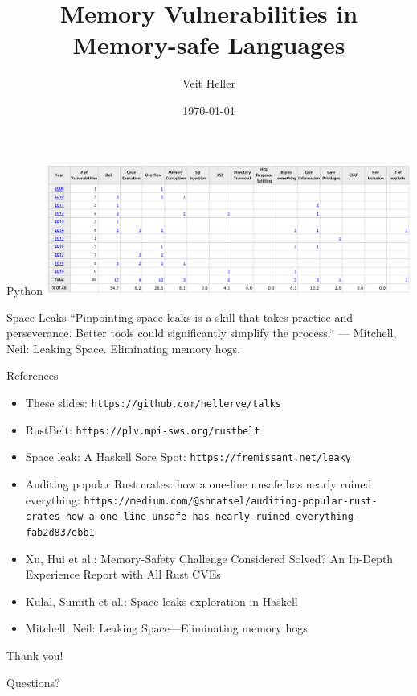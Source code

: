 \documentclass[aspectratio=169,14pt]{beamer}
\title{Memory Vulnerabilities in Memory-safe Languages}
\date{\today}
\author{Veit Heller}
\institute{Information Security Meetup Berlin, August 2020}
\begin{document}
  \maketitle
  \begin{frame}{Python}
    \includegraphics[width=12cm]{python_cves}
  \end{frame}
  \begin{frame}{Space Leaks}
    ``Pinpointing space leaks is a skill that takes practice and perseverance. Better
    tools could significantly simplify the process.``
    --- Mitchell, Neil: Leaking Space. Eliminating memory hogs.
  \end{frame}
  \begin{frame}{References}
    \begin{itemize}
      \item These slides: \texttt{https://github.com/hellerve/talks}
      \item RustBelt: \texttt{https://plv.mpi-sws.org/rustbelt}
      \item Space leak: A Haskell Sore Spot: \texttt{https://fremissant.net/leaky}
      \item Auditing popular Rust crates: how a one-line unsafe has nearly ruined everything: \texttt{https://medium.com/@shnatsel/auditing-popular-rust-crates-how-a-one-line-unsafe-has-nearly-ruined-everything-fab2d837ebb1}
      \item Xu, Hui et al.: Memory-Safety Challenge Considered Solved? An In-Depth Experience Report with All Rust CVEs
      \item Kulal, Sumith et al.: Space leaks exploration in Haskell
      \item Mitchell, Neil: Leaking Space—Eliminating memory hogs
    \end{itemize}
  \end{frame}
  \begin{frame}{}
    Thank you!

    \bigskip

    Questions?
  \end{frame}
\end{document}
